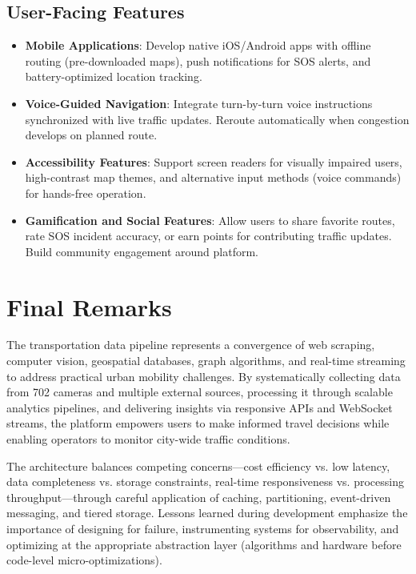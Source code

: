 \subsection{User-Facing Features}

\begin{itemize}
    \item \textbf{Mobile Applications}: Develop native iOS/Android apps with offline routing (pre-downloaded maps), push notifications for SOS alerts, and battery-optimized location tracking.
    
    \item \textbf{Voice-Guided Navigation}: Integrate turn-by-turn voice instructions synchronized with live traffic updates. Reroute automatically when congestion develops on planned route.
    
    \item \textbf{Accessibility Features}: Support screen readers for visually impaired users, high-contrast map themes, and alternative input methods (voice commands) for hands-free operation.
    
    \item \textbf{Gamification and Social Features}: Allow users to share favorite routes, rate SOS incident accuracy, or earn points for contributing traffic updates. Build community engagement around platform.
\end{itemize}

\section{Final Remarks}

The transportation data pipeline represents a convergence of web scraping, computer vision, geospatial databases, graph algorithms, and real-time streaming to address practical urban mobility challenges. By systematically collecting data from 702 cameras and multiple external sources, processing it through scalable analytics pipelines, and delivering insights via responsive APIs and WebSocket streams, the platform empowers users to make informed travel decisions while enabling operators to monitor city-wide traffic conditions.

The architecture balances competing concerns—cost efficiency vs. low latency, data completeness vs. storage constraints, real-time responsiveness vs. processing throughput—through careful application of caching, partitioning, event-driven messaging, and tiered storage. Lessons learned during development emphasize the importance of designing for failure, instrumenting systems for observability, and optimizing at the appropriate abstraction layer (algorithms and hardware before code-level micro-optimizations).

